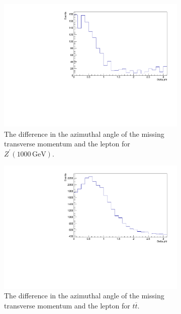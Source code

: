 \begin{figure}[H]
\begin{subfigure}{0.49\textwidth}
    \centering%
    \includegraphics[width=\textwidth]{plots/discriminant/zprime1000.el_del_phi.pdf}%
    \caption{The difference in the azimuthal angle of the missing transverse momentum and the lepton for $Z^\prime(1000 \, \si{\giga\eV})$.}%
    \label{fig:5c}%
  \end{subfigure}%
  \hfill
  \begin{subfigure}{0.49\textwidth}%
    \centering%
    \includegraphics[width=\textwidth]{plots/discriminant/ttbar.el_del_phi.pdf}%
    \caption{The difference in the azimuthal angle of the missing transverse momentum and the lepton for $t \overline{t}$.}%
    \label{fig:5d}
  \end{subfigure}\\
  \begin{subfigure}{0.49\textwidth}%
    \centering%

\end{subfigure}
\end{figure}
